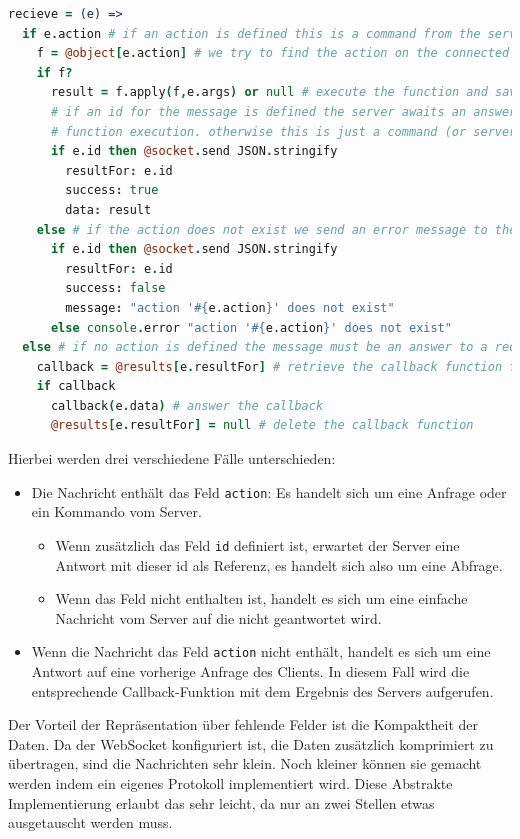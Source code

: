 \begin{lstlisting}[language=coffee]
recieve = (e) =>  
  if e.action # if an action is defined this is a command from the server
    f = @object[e.action] # we try to find the action on the connected object
    if f?
      result = f.apply(f,e.args) or null # execute the function and save the result
      # if an id for the message is defined the server awaits an answer with the result of the
      # function execution. otherwise this is just a command (or server-push)
      if e.id then @socket.send JSON.stringify 
        resultFor: e.id
        success: true
        data: result
    else # if the action does not exist we send an error message to the server
      if e.id then @socket.send JSON.stringify
        resultFor: e.id
        success: false
        message: "action '#{e.action}' does not exist"
      else console.error "action '#{e.action}' does not exist"
  else # if no action is defined the message must be an answer to a request
    callback = @results[e.resultFor] # retrieve the callback function for this action
    if callback 
      callback(e.data) # answer the callback
      @results[e.resultFor] = null # delete the callback function
\end{lstlisting}

Hierbei werden drei verschiedene Fälle unterschieden:

\begin{itemize}  
  \item Die Nachricht enthält das Feld \texttt{action}: Es handelt sich um eine
Anfrage oder ein Kommando vom Server.
  \begin{itemize}
    \item Wenn zusätzlich das Feld \texttt{id} definiert ist, erwartet der Server eine Antwort mit 
    dieser id als Referenz, es handelt sich also um eine Abfrage.
    \item Wenn das Feld nicht enthalten ist, handelt es sich um eine einfache Nachricht vom Server
    auf die nicht geantwortet wird.
  \end{itemize}
  \item Wenn die Nachricht das Feld \texttt{action} nicht enthält, handelt es sich um eine Antwort 
  auf eine vorherige Anfrage des Clients. In diesem Fall wird die entsprechende Callback-Funktion mit
  dem Ergebnis des Servers aufgerufen.
\end{itemize}

Der Vorteil der Repräsentation über fehlende Felder ist die Kompaktheit der Daten. Da der WebSocket
konfiguriert ist, die Daten zusätzlich komprimiert zu übertragen, sind die Nachrichten sehr klein.
Noch kleiner können sie gemacht werden indem ein eigenes Protokoll implementiert wird. Diese
Abstrakte Implementierung erlaubt das sehr leicht, da nur an zwei Stellen etwas ausgetauscht werden
muss.

